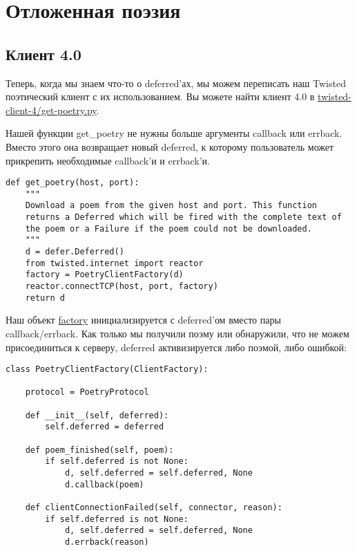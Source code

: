 
\section{Отложенная поэзия\label{sec:part8}}

\subsection{Клиент 4.0}


Теперь, когда мы знаем что-то о deferred'ах, мы можем 
переписать наш Twisted поэтический клиент с их использованием. 
Вы можете найти клиент 4.0 в 
\href{http://github.com/jdavisp3/twisted-intro/blob/master/twisted-client-4/get-poetry.py}{twisted-client-4/get-poetry.py}.


Нашей функции get\_poetry не нужны больше аргументы callback или errback. 
Вместо этого она возвращает новый deferred, к которому пользователь 
может прикрепить необходимые callback'и и errback'и.

 \begin{verbatim}
def get_poetry(host, port):
    """
    Download a poem from the given host and port. This function
    returns a Deferred which will be fired with the complete text of
    the poem or a Failure if the poem could not be downloaded.
    """
    d = defer.Deferred()
    from twisted.internet import reactor
    factory = PoetryClientFactory(d)
    reactor.connectTCP(host, port, factory)
    return d
\end{verbatim} 
Наш объект  
\href{http://github.com/jdavisp3/twisted-intro/blob/master/twisted-client-4/get-poetry.py#L65}{factory}  
инициализируется с deferred'ом 
вместо пары  callback/errback. Как только мы получили поэму или 
обнаружили, что не можем присоединиться к серверу, deferred 
активизируется либо поэмой, либо ошибкой: 

 \begin{verbatim}
class PoetryClientFactory(ClientFactory):

    protocol = PoetryProtocol

    def __init__(self, deferred):
        self.deferred = deferred

    def poem_finished(self, poem):
        if self.deferred is not None:
            d, self.deferred = self.deferred, None
            d.callback(poem)

    def clientConnectionFailed(self, connector, reason):
        if self.deferred is not None:
            d, self.deferred = self.deferred, None
            d.errback(reason)
\end{verbatim} 


